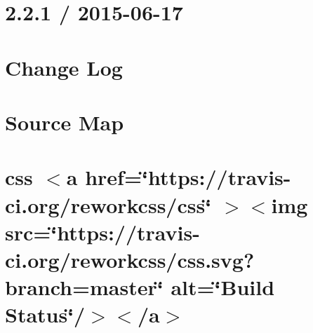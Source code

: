 \documentclass[twoside]{book}
\newcommand{\+}{\discretionary{\mbox{\scriptsize$\hookleftarrow$}}{}{}}
\begin{document}
\chapter{2.2.1 / 2015-\/06-\/17}
\label{md__c___users_vaishnavi_jadhav__desktop__developer_code_mean_stack_example_client_node_modules_css__history}

\chapter{Change Log}
\label{md__c___users_vaishnavi_jadhav__desktop__developer_code_mean_stack_example_client_node_modules_c86d507fb9ad61953c0169a5f72251f0d}

\chapter{Source Map}
\label{md__c___users_vaishnavi_jadhav__desktop__developer_code_mean_stack_example_client_node_modules_c2716231761bc898dc6c6cd3edd527a81}

\chapter{css \texorpdfstring{$<$}{<}a href=\char`\"{}https\+://travis-\/ci.\+org/reworkcss/css\char`\"{} \texorpdfstring{$>$}{>}\texorpdfstring{$<$}{<}img src=\char`\"{}https\+://travis-\/ci.\+org/reworkcss/css.\+svg?branch=master\char`\"{} alt=\char`\"{}\+Build Status\char`\"{}/\texorpdfstring{$>$}{>}\texorpdfstring{$<$}{<}/a\texorpdfstring{$>$}{>}}
\label{md__c___users_vaishnavi_jadhav__desktop__developer_code_mean_stack_example_client_node_modules_css__readme}

\end{document}
